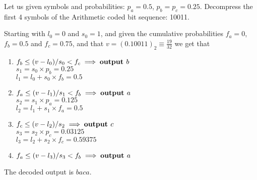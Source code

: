 \exercise

Let us given symbols and probabilities: $p_a = 0.5$, $p_b = p_c = 0.25$.
Decompress the first 4 symbols of the Arithmetic coded bit sequence: 10011.

\solution

Starting with $l_0 = 0$ and $s_0 = 1$, and given the cumulative probabilities
$f_a =0$, $f_b = 0.5$ and $f_c = 0.75$, and that $v = (0.10011)_2 \equiv
\frac{19}{32}$ we get that
%
\begin{enumerate}
  \item $f_b \le (v - l_0)/s_0 < f_c \implies \text{\bf output } b$ \\
  $s_1 = s_0 \times p_b = 0.25$ \\
  $l_1 = l_0 + s_0 \times f_b = 0.5$
  \item $f_a \le (v - l_1)/s_1 < f_b \implies \text{\bf output } a$ \\
  $s_2 = s_1 \times p_a = 0.125$ \\
  $l_2 = l_1 + s_1 \times f_a = 0.5$
  \item $f_c \le (v - l_2)/s_2 \implies \text{\bf output } c$ \\
  $s_3 = s_2 \times p_c = 0.03125$ \\
  $l_3 = l_2 + s_2 \times f_c = 0.59375$
  \item $f_a \le (v - l_3)/s_3 < f_b \implies \text{\bf output } a$
\end{enumerate}
%
The decoded output is $baca$.
